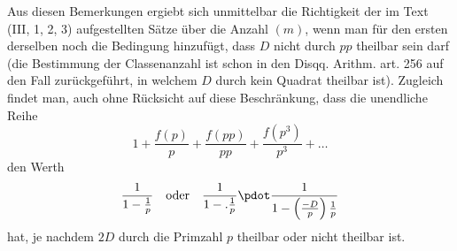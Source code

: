 Aus diesen Bemerkungen ergiebt sich unmittelbar die Richtigkeit der im Text (III, 1, 2, 3) aufgestellten Sätze über die Anzahl $(m)$, wenn man für den ersten derselben noch die Bedingung hinzufügt, dass $D$ nicht durch $pp$ theilbar sein darf (die Bestimmung der Classenanzahl ist schon in den Disqq. Arithm. art. 256 auf den Fall zurückgeführt, in welchem $D$ durch kein Quadrat theilbar ist). Zugleich findet man, auch ohne Rücksicht auf diese Beschränkung, dass die unendliche Reihe
\[
1+\frac{f(p)}p+\frac{f(pp)}{pp}+\frac{f(p^3)}{p^3}+\ldots
\]
den Werth
\[
\frac1{1-\frac1p}\quad\text{oder}\quad\frac1{1-.\frac1p}\pdot\frac1{1-\left(\frac{-D}p\right)\frac1p}
\]
hat, je nachdem $2D$ durch die Primzahl $p$ theilbar oder nicht theilbar ist.
